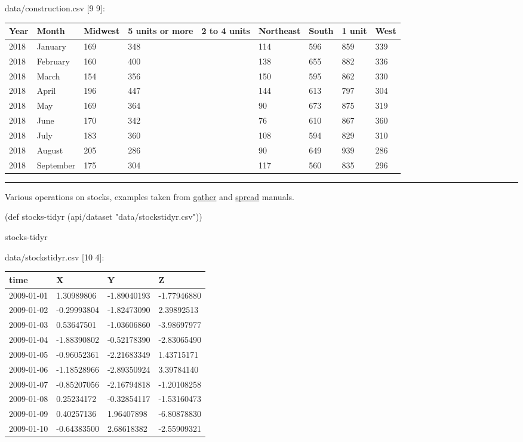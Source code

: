 \documentclass[]{article}
\newenvironment{Shaded}{\begin{snugshade}}{\end{snugshade}}
\newcommand{\BuiltInTok}[1]{#1}
\newcommand{\FunctionTok}[1]{\textcolor[rgb]{0.00,0.00,0.00}{#1}}
\newcommand{\NormalTok}[1]{#1}
\newcommand{\StringTok}[1]{\textcolor[rgb]{0.31,0.60,0.02}{#1}}
\begin{document}
data/construction.csv {[}9 9{]}:

\begin{longtable}[]{@{}lllllllll@{}}
\toprule
Year & Month & Midwest & 5 units or more & 2 to 4 units & Northeast &
South & 1 unit & West\tabularnewline
\midrule
\endhead
2018 & January & 169 & 348 & & 114 & 596 & 859 & 339\tabularnewline
2018 & February & 160 & 400 & & 138 & 655 & 882 & 336\tabularnewline
2018 & March & 154 & 356 & & 150 & 595 & 862 & 330\tabularnewline
2018 & April & 196 & 447 & & 144 & 613 & 797 & 304\tabularnewline
2018 & May & 169 & 364 & & 90 & 673 & 875 & 319\tabularnewline
2018 & June & 170 & 342 & & 76 & 610 & 867 & 360\tabularnewline
2018 & July & 183 & 360 & & 108 & 594 & 829 & 310\tabularnewline
2018 & August & 205 & 286 & & 90 & 649 & 939 & 286\tabularnewline
2018 & September & 175 & 304 & & 117 & 560 & 835 & 296\tabularnewline
\bottomrule
\end{longtable}

\begin{center}\rule{0.5\linewidth}{0.5pt}\end{center}

Various operations on stocks, examples taken from
\href{https://tidyr.tidyverse.org/reference/gather.html}{gather} and
\href{https://tidyr.tidyverse.org/reference/spread.html}{spread}
manuals.

\begin{Shaded}
\begin{Highlighting}[]
\NormalTok{(}\BuiltInTok{def}\FunctionTok{ stocks-tidyr }\NormalTok{(api/dataset }\StringTok{"data/stockstidyr.csv"}\NormalTok{))}
\end{Highlighting}
\end{Shaded}

\begin{Shaded}
\begin{Highlighting}[]
\NormalTok{stocks-tidyr}
\end{Highlighting}
\end{Shaded}

data/stockstidyr.csv {[}10 4{]}:

\begin{longtable}[]{@{}llll@{}}
\toprule
time & X & Y & Z\tabularnewline
\midrule
\endhead
2009-01-01 & 1.30989806 & -1.89040193 & -1.77946880\tabularnewline
2009-01-02 & -0.29993804 & -1.82473090 & 2.39892513\tabularnewline
2009-01-03 & 0.53647501 & -1.03606860 & -3.98697977\tabularnewline
2009-01-04 & -1.88390802 & -0.52178390 & -2.83065490\tabularnewline
2009-01-05 & -0.96052361 & -2.21683349 & 1.43715171\tabularnewline
2009-01-06 & -1.18528966 & -2.89350924 & 3.39784140\tabularnewline
2009-01-07 & -0.85207056 & -2.16794818 & -1.20108258\tabularnewline
2009-01-08 & 0.25234172 & -0.32854117 & -1.53160473\tabularnewline
2009-01-09 & 0.40257136 & 1.96407898 & -6.80878830\tabularnewline
2009-01-10 & -0.64383500 & 2.68618382 & -2.55909321\tabularnewline
\bottomrule
\end{longtable}
\end{document}
